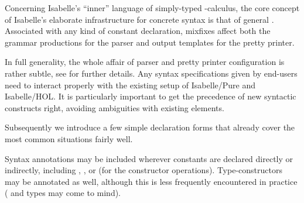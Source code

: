 %
\begin{isabellebody}%
\def\isabellecontext{Documents}%
\isamarkupfalse%
%
\isamarkuptrue%
%
\begin{isamarkuptext}%
Concerning Isabelle's ``inner'' language of simply-typed \isa{{\isasymlambda}}-calculus, the core concept of Isabelle's elaborate
  infrastructure for concrete syntax is that of general
  .  Associated with any kind of constant
  declaration, mixfixes affect both the grammar productions for the
  parser and output templates for the pretty printer.

  In full generality, the whole affair of parser and pretty printer
  configuration is rather subtle, see \cite{isabelle-ref} for further
  details.  Any syntax specifications given by end-users need to
  interact properly with the existing setup of Isabelle/Pure and
  Isabelle/HOL.  It is particularly important to get the precedence of
  new syntactic constructs right, avoiding ambiguities with existing
  elements.

  \medskip Subsequently we introduce a few simple declaration forms
  that already cover the most common situations fairly well.%
\end{isamarkuptext}%
\isamarkuptrue%
%
\isamarkuptrue%
%
\begin{isamarkuptext}%
Syntax annotations may be included wherever constants are declared
  directly or indirectly, including ,
  , or  (for the
  constructor operations).  Type-constructors may be annotated as
  well, although this is less frequently encountered in practice
  (\isa{{\isacharasterisk}} and \isa{{\isacharplus}} types may come to mind).


\end{isamarkuptext}
\end{isabellebody}
